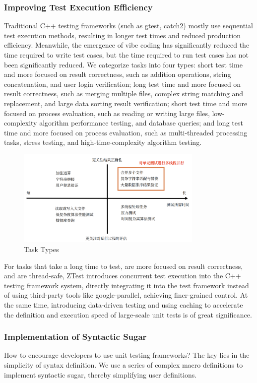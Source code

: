 \documentclass{article}
\begin{document}
\subsubsection{Improving Test Execution Efficiency}
Traditional C++ testing frameworks (such as gtest, catch2) mostly use sequential test execution methods, resulting in longer test times and reduced production efficiency. Meanwhile, the emergence of vibe coding has significantly reduced the time required to write test cases, but the time required to run test cases has not been significantly reduced.
We categorize tasks into four types: short test time and more focused on result correctness, such as addition operations, string concatenation, and user login verification; long test time and more focused on result correctness, such as merging multiple files, complex string matching and replacement, and large data sorting result verification; short test time and more focused on process evaluation, such as reading or writing large files, low-complexity algorithm performance testing, and database queries; and long test time and more focused on process evaluation, such as multi-threaded processing tasks, stress testing, and high-time-complexity algorithm testing.
\begin{figure}[H]
    \centering
    \includegraphics[width=0.8\textwidth]{img/task.png} %
    \caption{Task Types}
    \label{fig:task types }
\end{figure}
For tasks that take a long time to test, are more focused on result correctness, and are thread-safe, ZTest introduces concurrent test execution into the C++ testing framework system, directly integrating it into the test framework instead of using third-party tools like google-parallel, achieving finer-grained control.
At the same time, introducing data-driven testing and using caching to accelerate the definition and execution speed of large-scale unit tests is of great significance.
\subsubsection{Implementation of Syntactic Sugar}
How to encourage developers to use unit testing frameworks? The key lies in the simplicity of syntax definition. We use a series of complex macro definitions to implement syntactic sugar, thereby simplifying user definitions.
\end{document}
